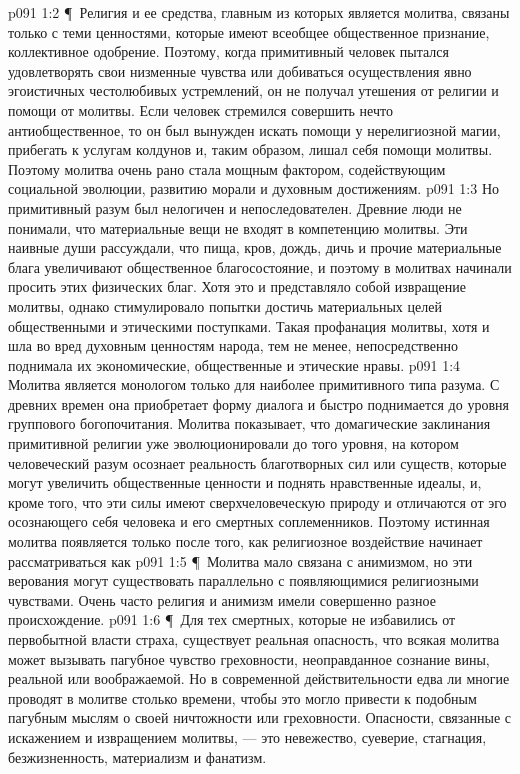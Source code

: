 \vs p091 1:2 \P\ Религия и ее средства, главным из которых является молитва, связаны только с теми ценностями, которые имеют всеобщее общественное признание, коллективное одобрение. Поэтому, когда примитивный человек пытался удовлетворять свои низменные чувства или добиваться осуществления явно эгоистичных честолюбивых устремлений, он не получал утешения от религии и помощи от молитвы. Если человек стремился совершить нечто антиобщественное, то он был вынужден искать помощи у нерелигиозной магии, прибегать к услугам колдунов и, таким образом, лишал себя помощи молитвы. Поэтому молитва очень рано стала мощным фактором, содействующим социальной эволюции, развитию морали и духовным достижениям.
\vs p091 1:3 Но примитивный разум был нелогичен и непоследователен. Древние люди не понимали, что материальные вещи не входят в компетенцию молитвы. Эти наивные души рассуждали, что пища, кров, дождь, дичь и прочие материальные блага увеличивают общественное благосостояние, и поэтому в молитвах начинали просить этих физических благ. Хотя это и представляло собой извращение молитвы, однако стимулировало попытки достичь материальных целей общественными и этическими поступками. Такая профанация молитвы, хотя и шла во вред духовным ценностям народа, тем не менее, непосредственно поднимала их экономические, общественные и этические нравы.
\vs p091 1:4 Молитва является монологом только для наиболее примитивного типа разума. С древних времен она приобретает форму диалога и быстро поднимается до уровня группового богопочитания. Молитва показывает, что домагические заклинания примитивной религии уже эволюционировали до того уровня, на котором человеческий разум осознает реальность благотворных сил или существ, которые могут увеличить общественные ценности и поднять нравственные идеалы, и, кроме того, что эти силы имеют сверхчеловеческую природу и отличаются от эго осознающего себя человека и его смертных соплеменников. Поэтому истинная молитва появляется только после того, как религиозное воздействие начинает рассматриваться как 
\vs p091 1:5 \P\ Молитва мало связана с анимизмом, но эти верования могут существовать параллельно с появляющимися религиозными чувствами. Очень часто религия и анимизм имели совершенно разное происхождение.
\vs p091 1:6 \P\ Для тех смертных, которые не избавились от первобытной власти страха, существует реальная опасность, что всякая молитва может вызывать пагубное чувство греховности, неоправданное сознание вины, реальной или воображаемой. Но в современной действительности едва ли многие проводят в молитве столько времени, чтобы это могло привести к подобным пагубным мыслям о своей ничтожности или греховности. Опасности, связанные с искажением и извращением молитвы, --- это невежество, суеверие, стагнация, безжизненность, материализм и фанатизм.

